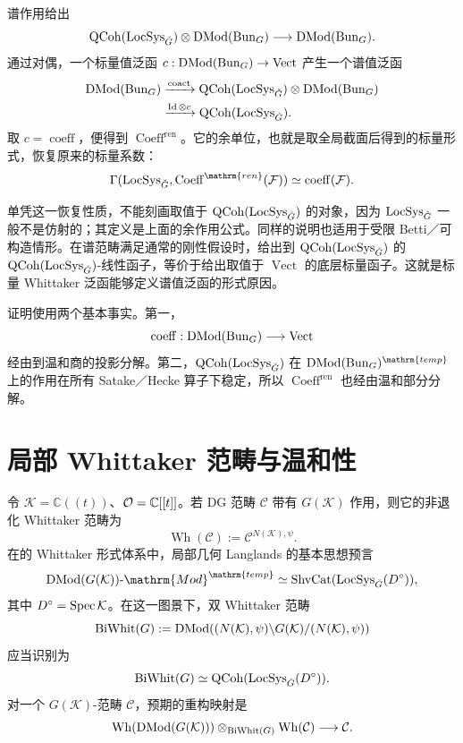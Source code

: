 谱作用给出
\[\operatorname{QCoh}(\operatorname{LocSys}_{\check{G}})\otimes\operatorname{DMod}(\operatorname{Bun}_G)\longrightarrow\operatorname{DMod}(\operatorname{Bun}_G).\]
通过对偶，一个标量值泛函 $c:\operatorname{DMod}(\operatorname{Bun}_G)\to\operatorname{Vect}$ 产生一个谱值泛函
\[\begin{split}
\operatorname{DMod}(\operatorname{Bun}_G)&\xrightarrow{\operatorname{coact}}\operatorname{QCoh}(\operatorname{LocSys}_{\check{G}})\otimes\operatorname{DMod}(\operatorname{Bun}_G)\\
&\xrightarrow{\operatorname{Id}\otimes c}\operatorname{QCoh}(\operatorname{LocSys}_{\check{G}}).
\end{split}\]
取 $c=\operatorname{coeff}$，便得到 $\operatorname{Coeff}^{\mathrm{ren}}$。它的余单位，也就是取全局截面后得到的标量形式，恢复原来的标量系数：
\[\Gamma(\LocSys_{\checkG},\operatorname{Coeff}^{\mathrm{ren}}(\cF))\simeq\operatorname{coeff}(\cF).\]
\begin{note}
单凭这一恢复性质，不能刻画取值于 $\operatorname{QCoh}(\operatorname{LocSys}_{\check{G}})$ 的对象，因为 $\operatorname{LocSys}_{\check{G}}$ 一般不是仿射的；其定义是上面的余作用公式。同样的说明也适用于受限 Betti／可构造情形。在谱范畴满足通常的刚性假设时，给出到 $\operatorname{QCoh}(\operatorname{LocSys}_{\check{G}})$ 的 $\operatorname{QCoh}(\operatorname{LocSys}_{\check{G}})$-线性函子，等价于给出取值于 $\operatorname{Vect}$ 的底层标量函子。这就是标量 Whittaker 泛函能够定义谱值泛函的形式原因。
\end{note}

证明使用两个基本事实。第一，
\[\operatorname{coeff}:\operatorname{DMod}(\operatorname{Bun}_G)\longrightarrow\operatorname{Vect}\]
经由到温和商的投影分解。第二，$\operatorname{QCoh}(\operatorname{LocSys}_{\check{G}})$ 在 $\DMod(\Bun_G)^{\mathrm{temp}}$ 上的作用在所有 Satake／Hecke 算子下稳定，所以 $\operatorname{Coeff}^{\mathrm{ren}}$ 也经由温和部分分解。

\section{局部 Whittaker 范畴与温和性}\label{sec:13.2}
令 $\mathcal K=\mathbb C((t))$、$\mathcal{O}=\mathbb C[[t]]$。若 DG 范畴 $\mathcal C$ 带有 $G(\mathcal K)$ 作用，则它的非退化 Whittaker 范畴为
\[\operatorname{Wh}(\mathcal C):=\mathcal C^{N(\mathcal K),\psi}.\]
在\cite{Gai18,FR23}的 Whittaker 形式体系中，局部几何 Langlands 的基本思想预言
\[\DMod(G(\mathcal K))\text{-}\mathrm{Mod}^{\mathrm{temp}}\simeq\operatorname{ShvCat}(\LocSys_{\checkG}(D^\circ)),\]
其中 $D^\circ=\operatorname{Spec}\mathcal K$。在这一图景下，双 Whittaker 范畴
\[\operatorname{BiWhit}(G):=\operatorname{DMod}((N(\mathcal K),\psi)\backslash G(\mathcal K)/(N(\mathcal K),\psi))\]
应当识别为
\[\operatorname{BiWhit}(G)\simeq\operatorname{QCoh}(\operatorname{LocSys}_{\check{G}}(D^\circ)).\]
对一个 $G(\mathcal K)$-范畴 $\mathcal C$，预期的重构映射是
\[\operatorname{Wh}(\operatorname{DMod}(G(\mathcal K)))\otimes_{\operatorname{BiWhit}(G)}\operatorname{Wh}(\mathcal C)\longrightarrow\mathcal C.\]

